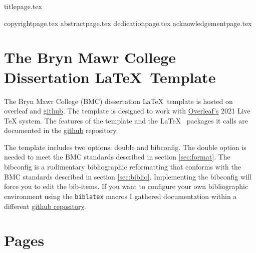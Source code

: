 \documentclass[12pt]{report}
\begin{document}
{titlepage.tex} %

{copyrightpage.tex}
{abstractpage.tex}
\setcounter{page}{2}
{dedicationpage.tex}
{acknowledgementpage.tex}
\newpage
\tableofcontents
\newpage
\begin{singlespacing}
\listoffigures
\end{singlespacing}
\newpage
\listoftables
{}
\newpage
\listofappendices
\newpage

\chapter{The Bryn Mawr College Dissertation \LaTeX~Template}
The Bryn Mawr College (BMC) dissertation \LaTeX~template is hosted on overleaf and \href{https://github.com/cacsphysics/BMC_Dissertation_Template}{github}. The template is designed to work with \href{https://www.overleaf.com/for/authors}{Overleaf's} 2021 Live TeX system. The features of the template and the \LaTeX~ packages it calls are documented in the \href{https://github.com/cacsphysics/BMC_Dissertation_Template}{github} repository.

The template includes two options: double and bibconfig. The double option is needed to meet the BMC standards described in section \ref{sec:format}. The bibconfig is a rudimentary bibliographic reformatting that conforms with the BMC standards described in section \ref{sec:biblio}. Implementing the bibconfig will force you to edit the bib-items. If you want to configure your own bibliographic environment using the \verb|biblatex| macros I gathered documentation within a different \href{https://github.com/cacsphysics/BMC_Template_Info_Files}{github repository}.

\chapter{Pages}
\end{document}
